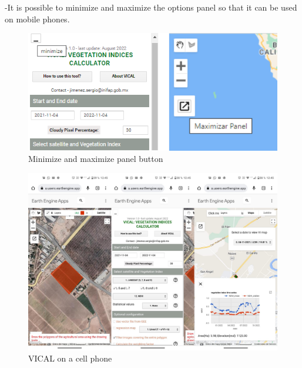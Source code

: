 \documentclass[
]{book}
\begin{document}
-It is possible to minimize and maximize the options panel so that it can be used on mobile phones.

\begin{figure}

{\centering \includegraphics{./images/FigureA5} 

}

\caption{Minimize and maximize panel button}\label{fig:figA5}
\end{figure}
\begin{figure}

{\centering \includegraphics{./images/FigureA6} 

}

\caption{VICAL on a cell phone}\label{fig:figA6}
\end{figure}

  
\end{document}
